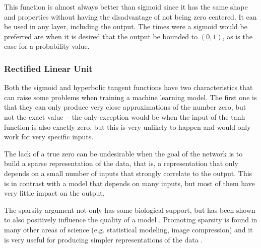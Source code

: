 This function is almost always better than sigmoid since it has the same shape and properties without having the disadvantage of not being zero centered. It can be used in any layer, including the output. The times were a sigmoid would be preferred are when it is desired that the output be bounded to $(0,1)$, as is the case for a probability value.

\subsubsection{Rectified Linear Unit} \label{subsub:relu}
Both the sigmoid and hyperbolic tangent functions have two characteristics that can raise some problems when training a machine learning model. The first one is that they can only produce very close approximations of the number zero, but not the exact value \textbf{--} the only exception would be when the input of the \gls{tanh} function is also exactly zero, but this is very unlikely to happen and would only work for very specific inputs.

The lack of a true zero can be undesirable when the goal of the network is to build a sparse representation of the data, that is, a representation that only depends on a small number of inputs that strongly correlate to the output. This is in contrast with a model that depends on many inputs, but most of them have very little impact on the output.

The sparsity argument not only has some biological support, but has been shown to also positively influence the quality of a model \cite{relu2011}. Promoting sparsity is found in many other areas of science (e.g. statistical modeling, image compression) and it is very useful for producing simpler representations of the data \cite{dataDrivenScience2019}.

